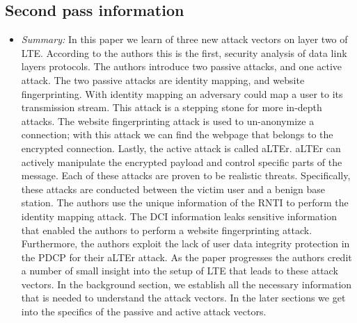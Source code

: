 \documentclass[letterpaper,twocolumn,10pt]{article}
\begin{document}
\subsection{Second pass information}
\label{sec:second}
\begin{itemize}
\item {\it Summary:} 
In this paper we learn of three new attack vectors on layer two of LTE. According to the authors this is the 
first, security analysis of data link layers protocols. The authors introduce two passive attacks, and one 
active attack. The two passive attacks are identity mapping, and website fingerprinting. With identity mapping
an adversary could map a user to its transmission stream. This attack is a stepping stone for more in-depth 
attacks. The website fingerprinting attack is used to un-anonymize a connection; with this attack we can find the 
webpage that belongs to the encrypted connection. Lastly, the active attack is called aLTEr. aLTEr can actively 
manipulate the encrypted payload and control specific parts of the message. Each of these attacks are proven
to be realistic threats. Specifically, these attacks are conducted between the victim user and a benign base 
station. The authors use the unique information of the RNTI to perform the identity mapping attack. The DCI
information leaks sensitive information that enabled the authors to perform a website fingerprinting attack.
Furthermore, the authors exploit the lack of user data integrity protection in the PDCP for their aLTEr attack.
As the paper progresses the authors credit a number of small insight into the setup of LTE that leads to these
attack vectors. In the background section, we establish all the necessary information that is needed to understand
the attack vectors. In the later sections we get into the specifics of the passive and active attack vectors. 

\end{itemize}
\end{document}
